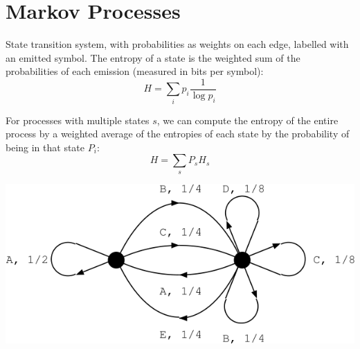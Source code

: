 \documentclass[a4paper, 11pt]{article}
\begin{document}
\section*{Markov Processes}
{
    \begin{minipage}[t]{0.5\textwidth}
    State transition system, with probabilities as weights on each edge, labelled with an emitted symbol. The entropy of a state is the weighted sum of the probabilities of each emission (measured in bits per symbol):
    \[H = \sum_i{p_i\frac{1}{\log{p_i}}}\]

    For processes with multiple states \(s\), we can compute the entropy of the entire process by a weighted average of the entropies of each state by the probability of being in that state \(P_i\):
    \[H = \sum_s{P_s H_s}\]
    \end{minipage}
    \hspace{4mm}
    \begin{minipage}[t]{0.46\textwidth}
    \vspace{0pt}
    \centering
    \includegraphics[width=\textwidth]{markov-process.png}
    \end{minipage}
}
\end{document}
